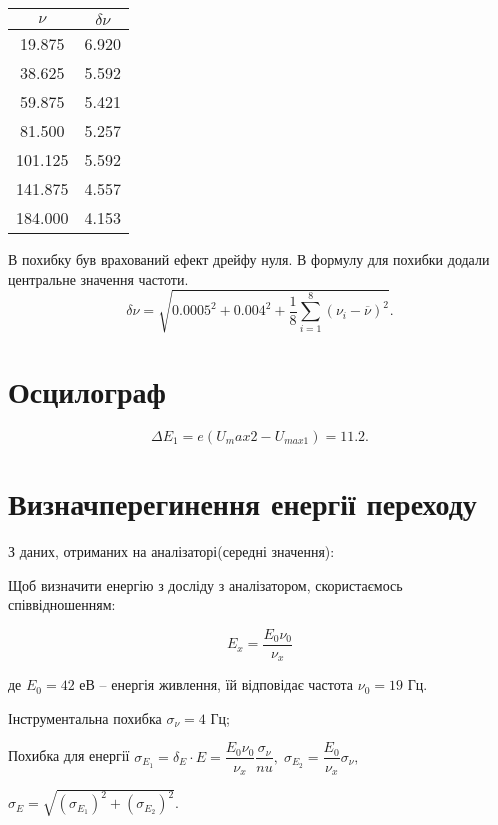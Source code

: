 \documentclass[12pt,a4paper]{article}
\begin{document}
\newpage
\begin{table}[!h]
    \centering
    \caption{}
    \begin{tabular}{cc}
        \hline
        $\nu $ & $\delta \nu$ \\
        \hline
        19.875 & 6.920\\
        38.625 & 5.592\\
        59.875 & 5.421\\
        81.500 & 5.257\\
        101.125 & 5.592\\
        141.875 & 4.557\\
        184.000 & 4.153\\
        \hline
    \end{tabular}
\end{table}

В похибку був врахований ефект дрейфу нуля.
В формулу для похибки додали центральне значення частоти.
\[
    \delta \nu = \sqrt{0.0005^2 + 0.004^{2} +
    \frac{1}{8}\sum_{i=1}^8 (\nu_i - \overline{\nu})^{2}}
.\]

\section*{Осцилограф}
\[
    \Delta E_1 = e ({U_max2} - U_{max1}) = 11.2
.\]



\section*{Визначперегинення енергії переходу}

З даних, отриманих на аналізаторі(середні значення):

Щоб визначити енергію з досліду з аналізатором, скористаємось співвідношенням:

\begin{equation}
	E_x = \dfrac{E_0 \nu_0}{\nu_x}
\end{equation}

де $E_0 = 42$ еВ -- енергія живлення, їй відповідає частота $\nu_0 = 19$ Гц.

Інструментальна похибка $\sigma_\nu = 4$ Гц;

Похибка для енергії $\sigma_{E_1} = \delta_E \cdot E = \dfrac{E_0 \nu_0}{\nu_x} \dfrac{\sigma_\nu}{nu}, \; \sigma_{E_2} = \dfrac{E_0}{\nu_x} \sigma_\nu,$

$\sigma_E = \sqrt{(\sigma_{E_1})^2 + (\sigma_{E_2})^2}$.
\end{document}
